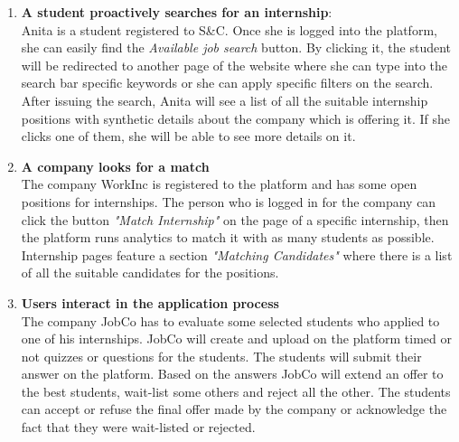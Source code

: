 \begin{enumerate}
            \item \textbf{A student proactively searches for an internship}:  
            \\Anita is a student registered to S\&C. Once she is logged into the platform, she can easily find the \textit{Available job search} button. By clicking it, the student will be redirected to another page of the website where she can type into the search bar specific keywords or she can apply specific filters on the search. After issuing the search, Anita will see a list of all the suitable internship positions with synthetic details about the company which is offering it. If she clicks one of them, she will be able to see more details on it.
            
            \item \textbf{A company looks for a match}   
            \\The company WorkInc is registered to the platform and has some open positions for internships. The person who is logged in for the company can click the button \textit{"Match Internship"} on the page of a specific internship, then the platform runs analytics to match it with as many students as possible. Internship pages feature a section \textit{"Matching Candidates"} where there is a list of all the suitable candidates for the positions. 
            
            \item \textbf{Users interact in the application process}
            \\ The company JobCo has to evaluate some selected students who applied to one of his internships. JobCo will create and upload on the platform timed or not quizzes or questions for the students. The students will submit their answer on the platform. Based on the answers JobCo will extend an offer to the best students, wait-list some others and reject all the other. The students can accept or refuse the final offer made by the company or acknowledge the fact that they were wait-listed or rejected.
            

\end{enumerate}
